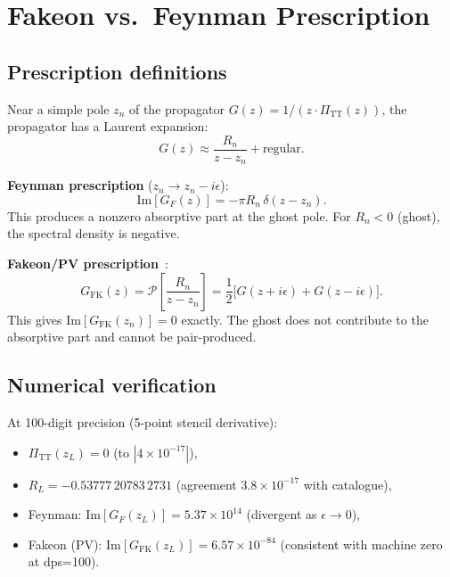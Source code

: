 \documentclass[11pt,a4paper]{article}
\newcommand{\PiTT}{\Pi_{\mathrm{TT}}}
\newcommand{\PV}{\mathcal{P}}
\newcommand{\Imag}{\mathrm{Im}}
\begin{document}
\section{Fakeon vs.\ Feynman Prescription}
\label{sec:fakeon}

\subsection{Prescription definitions}

Near a simple pole $z_n$ of the propagator $G(z) = 1/(z\cdot\PiTT(z))$,
the propagator has a Laurent expansion:
\begin{equation}
  G(z) \approx \frac{R_n}{z - z_n} + \text{regular}.
\end{equation}

\textbf{Feynman prescription} ($z_n \to z_n - i\epsilon$):
\begin{equation}\label{eq:feynman-disc}
  \Imag[G_F(z)] = -\pi R_n \,\delta(z - z_n).
\end{equation}
This produces a nonzero absorptive part at the ghost pole.
For $R_n < 0$ (ghost), the spectral density is negative.

\textbf{Fakeon/PV prescription}~\cite{Anselmi2017,Anselmi2018}:
\begin{equation}\label{eq:fakeon}
  G_{\text{FK}}(z) = \PV\!\left[\frac{R_n}{z - z_n}\right]
  = \frac{1}{2}\bigl[G(z + i\epsilon) + G(z - i\epsilon)\bigr].
\end{equation}
This gives $\Imag[G_{\text{FK}}(z_n)] = 0$ exactly.
The ghost does not contribute to the absorptive part and cannot
be pair-produced.

\subsection{Numerical verification}

At 100-digit precision (5-point stencil derivative):
\begin{itemize}
  \item $\PiTT(z_L) = 0$ (to $|4 \times 10^{-17}|$),
  \item $R_L = -0.53777\,20783\,2731$ (agreement $3.8 \times 10^{-17}$
    with catalogue),
  \item Feynman: $\Imag[G_F(z_L)] = 5.37 \times 10^{14}$ (divergent
    as $\epsilon \to 0$),
  \item Fakeon (PV): $\Imag[G_{\text{FK}}(z_L)] = 6.57 \times 10^{-84}$
    (consistent with machine zero at dps=100).
\end{itemize}
\end{document}
